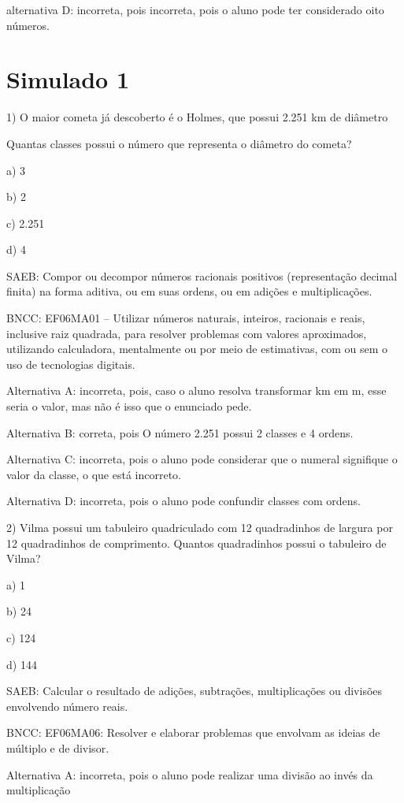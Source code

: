 alternativa D: incorreta, pois incorreta, pois o aluno pode ter
considerado oito números.

\chapter{Simulado 1}

1) O maior cometa já descoberto é o Holmes, que possui 2.251 km de
diâmetro

Quantas classes possui o número que representa o diâmetro do cometa?

a) 3

b) 2

c) 2.251

d) 4

SAEB: Compor ou decompor números racionais positivos (representação
decimal finita) na forma aditiva, ou em suas ordens, ou em adições e
multiplicações.

BNCC: EF06MA01 -- Utilizar números naturais, inteiros, racionais e
reais, inclusive raiz quadrada, para resolver problemas com valores
aproximados, utilizando calculadora, mentalmente ou por meio de
estimativas, com ou sem o uso de tecnologias digitais.

Alternativa A: incorreta, pois, caso o aluno resolva transformar km em
m, esse seria o valor, mas não é isso que o enunciado pede.

Alternativa B: correta, pois O número 2.251 possui 2 classes e 4 ordens.

Alternativa C: incorreta, pois o aluno pode considerar que o numeral
signifique o valor da classe, o que está incorreto.

Alternativa D: incorreta, pois o aluno pode confundir classes com
ordens.

2) Vilma possui um tabuleiro quadriculado com 12 quadradinhos de largura
por 12 quadradinhos de comprimento. Quantos quadradinhos possui o
tabuleiro de Vilma?

a) 1

b) 24

c) 124

d) 144

SAEB: Calcular o resultado de adições, subtrações, multiplicações ou
divisões envolvendo número reais.

BNCC: EF06MA06: Resolver e elaborar problemas que envolvam as ideias de
múltiplo e de divisor.

Alternativa A: incorreta, pois o aluno pode realizar uma divisão ao
invés da multiplicação

